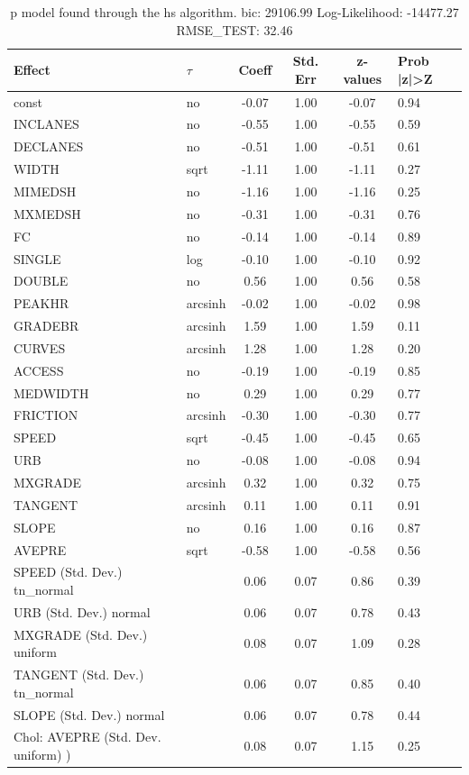\begin{table}
	\caption{p model found through the hs algorithm. bic: 29106.99 Log-Likelihood: -14477.27 RMSE_TEST: 32.46}
	\begin{center}
		\begin{tabular}{|l|l|c|c|c|l|}
			\hline
			Effect & $\tau$ & Coeff & Std. Err & z-values & Prob |z|>Z \\
			\hline
			const & no & -0.07 & 1.00 & -0.07 & 0.94 \\
			\hline
			INCLANES & no & -0.55 & 1.00 & -0.55 & 0.59 \\
			\hline
			DECLANES & no & -0.51 & 1.00 & -0.51 & 0.61 \\
			\hline
			WIDTH & sqrt & -1.11 & 1.00 & -1.11 & 0.27 \\
			\hline
			MIMEDSH & no & -1.16 & 1.00 & -1.16 & 0.25 \\
			\hline
			MXMEDSH & no & -0.31 & 1.00 & -0.31 & 0.76 \\
			\hline
			FC & no & -0.14 & 1.00 & -0.14 & 0.89 \\
			\hline
			SINGLE & log & -0.10 & 1.00 & -0.10 & 0.92 \\
			\hline
			DOUBLE & no & 0.56 & 1.00 & 0.56 & 0.58 \\
			\hline
			PEAKHR & arcsinh & -0.02 & 1.00 & -0.02 & 0.98 \\
			\hline
			GRADEBR & arcsinh & 1.59 & 1.00 & 1.59 & 0.11 \\
			\hline
			CURVES & arcsinh & 1.28 & 1.00 & 1.28 & 0.20 \\
			\hline
			ACCESS & no & -0.19 & 1.00 & -0.19 & 0.85 \\
			\hline
			MEDWIDTH & no & 0.29 & 1.00 & 0.29 & 0.77 \\
			\hline
			FRICTION & arcsinh & -0.30 & 1.00 & -0.30 & 0.77 \\
			\hline
			SPEED & sqrt & -0.45 & 1.00 & -0.45 & 0.65 \\
			\hline
			URB & no & -0.08 & 1.00 & -0.08 & 0.94 \\
			\hline
			MXGRADE & arcsinh & 0.32 & 1.00 & 0.32 & 0.75 \\
			\hline
			TANGENT & arcsinh & 0.11 & 1.00 & 0.11 & 0.91 \\
			\hline
			SLOPE & no & 0.16 & 1.00 & 0.16 & 0.87 \\
			\hline
			AVEPRE & sqrt & -0.58 & 1.00 & -0.58 & 0.56 \\
			\hline
			SPEED (Std. Dev.) tn_normal &  & 0.06 & 0.07 & 0.86 & 0.39 \\
			\hline
			URB (Std. Dev.) normal &  & 0.06 & 0.07 & 0.78 & 0.43 \\
			\hline
			MXGRADE (Std. Dev.) uniform &  & 0.08 & 0.07 & 1.09 & 0.28 \\
			\hline
			TANGENT (Std. Dev.) tn_normal &  & 0.06 & 0.07 & 0.85 & 0.40 \\
			\hline
			SLOPE (Std. Dev.) normal &  & 0.06 & 0.07 & 0.78 & 0.44 \\
			\hline
			 Chol: AVEPRE (Std. Dev. uniform) ) &  & 0.08 & 0.07 & 1.15 & 0.25 \\
			\hline
		\end{tabular}
	\end{center}
\end{table}